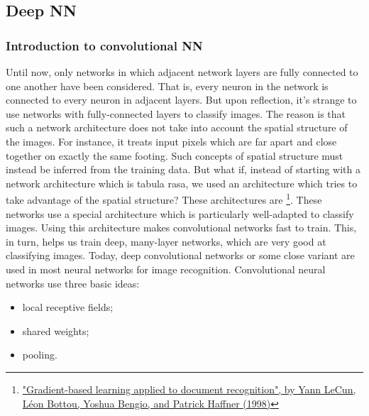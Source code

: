 {\subsection{Deep NN}

\subsubsection{Introduction to convolutional NN}
Until now, only networks in which adjacent network layers are fully connected to one another have been considered. That is, every neuron in the network is connected to every neuron in adjacent layers. But upon reflection, it's strange to use networks with fully-connected layers to classify images. The reason is that such a network architecture does not take into account the spatial structure of the images. For instance, it treats input pixels which are far apart and close together on exactly the same footing. Such concepts of spatial structure must instead be inferred from the training data. But what if, instead of starting with a network architecture which is tabula rasa, we used an architecture which tries to take advantage of the spatial structure? These architectures are \footnote{\href{http://yann.lecun.com/exdb/publis/pdf/lecun-98.pdf}{ "Gradient-based learning applied to document recognition", by Yann LeCun, Léon Bottou, Yoshua Bengio, and Patrick Haffner (1998)}}. These networks use a special architecture which is particularly well-adapted to classify images. Using this architecture makes convolutional networks fast to train. This, in turn, helps us train deep, many-layer networks, which are very good at classifying images. Today, deep convolutional networks or some close variant are used in most neural networks for image recognition.
Convolutional neural networks use three basic ideas: 

\begin{itemize}
\item local receptive fields;
\item shared weights;
\item pooling.
\end{itemize}

}
